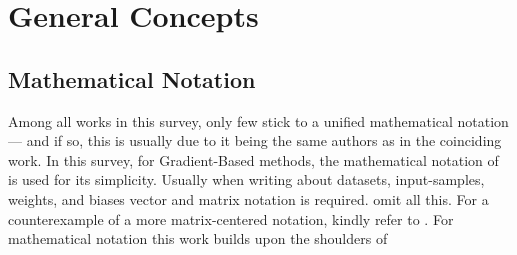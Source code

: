 \section{General Concepts}

\subsection{Mathematical Notation}
Among all works in this survey, only few stick to a unified mathematical notation --- and if so, this is usually due to it being the same authors as in the coinciding work. In this survey, for Gradient-Based methods, the mathematical notation of  is used for its simplicity. Usually when writing about datasets, input-samples, weights, and biases vector and matrix notation is required.  omit all this. For a counterexample of a more matrix-centered notation, kindly refer to .
For mathematical notation this work builds upon the shoulders of~\cite{Kindermans.2018}





